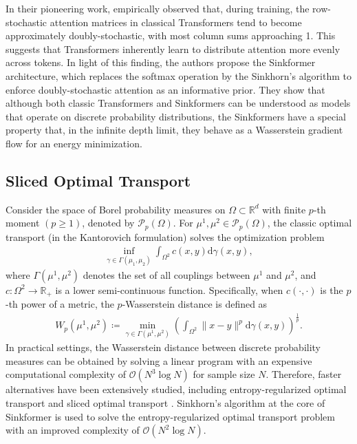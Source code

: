In their pioneering work, \citet{sander2022Sinkformers} empirically observed that, during training, the row-stochastic attention matrices in classical Transformers tend to become approximately doubly-stochastic, with most column sums approaching 1. This suggests that Transformers inherently learn to distribute attention more evenly across tokens. In light of this finding, the authors propose the Sinkformer architecture, which replaces the softmax operation by the Sinkhorn's algorithm \cite{sinkhorn1964relationship, cuturi2013sinkhorn, peyre2019computational} to enforce doubly-stochastic attention as an informative prior. They show that although both classic Transformers and Sinkformers can be understood as models that operate on discrete probability distributions, the Sinkformers have a special property that, in the infinite depth limit, they behave as a Wasserstein gradient flow for an energy minimization.

\subsection{Sliced Optimal Transport}
Consider the space of Borel probability measures on $\Omega\subset\mathbb{R}^d$ with finite $p$-th moment $(p\ge 1)$, denoted by $\mathcal{P}_p(\Omega)$. For $\mu^1, \mu^2\in \mathcal{P}_p(\Omega)$, the classic optimal transport (in the Kantorovich formulation) solves the optimization problem
\begin{align}
    \inf_{\gamma\in\Gamma(\mu_1, \mu_2)}\int_{\Omega^2}c(x, y)\text{d}\gamma(x, y),
\end{align}
where $\Gamma(\mu^1, \mu^2)$ denotes the set of all couplings between $\mu^1$ and $\mu^2$, and $c:\Omega^2\rightarrow\mathbb{R}_+$ is a lower semi-continuous function. Specifically, when $c(\cdot, \cdot)$ is the $p$-th power of a metric, the $p$-Wasserstein distance is defined as
\vspace{-.1in}
\begin{align}
    W_p(\mu^1, \mu^2) \coloneqq \min_{\gamma\in\Gamma(\mu^1, \mu^2)}\left(\int_{\Omega^2}\|x-y\|^p\text{d}\gamma(x, y)\right)^{\frac{1}{p}}.
\end{align}
In practical settings, the Wasserstein distance between discrete probability measures can be obtained by solving a linear program \cite{peyre2019computational} with an expensive computational complexity of $\mathcal{O}(N^3\log N)$ for sample size $N$. Therefore, faster alternatives have been extensively studied, including entropy-regularized optimal transport \cite{cuturi2013sinkhorn} and sliced optimal transport \cite{kolouri2016sliced, kolouri2018sliced, deshpande2019max, kolouri2019generalized, nguyen2022hierarchical, nguyen2024energy}. Sinkhorn's algorithm at the core of Sinkformer is used to solve the entropy-regularized optimal transport problem with an improved complexity of $\mathcal{O}(N^2\log N)$.

